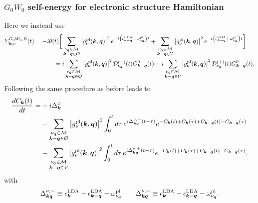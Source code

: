 \subsubsection{$G_0W_0$ self-energy for electronic structure Hamiltonian}
Here we instead use 
\begin{align}
\Sigma_{\bm{k},c}^{G_0W_0,R}(t)
=
-i\theta(t)
\bigg[
&
\sum_{\substack{\nu_{\bm q}\in\mathcal M\\
\bm{k}-\bm q\in\mathcal O}}
\left|g_{\nu}^{\rm pl}(\bm{k},\bm q)\right|^2
e^{-i\left(
\epsilon_{\bm{k}-\bm q}^{\rm LDA}
-
\omega_{\nu_{\bm q}}^{\rm pl}
\right)t}+
\sum_{\substack{\nu_{\bm q}\in\mathcal M\\
\bm{k}-\bm q\in\mathcal V}}
\left|g_{\nu}^{\rm pl}(\bm{k},\bm q)\right|^2
e^{-i\left(
\epsilon_{\bm{k}-\bm q}^{\rm LDA}
+
\omega_{\nu_{\bm q}}^{\rm pl}
\right)t}
\bigg]\\
={}&
i
\sum_{\substack{\nu_{\bm q}\in\mathcal M\\
\bm{k}-\bm q\in\mathcal O}}
\left|g_{\nu}^{\rm pl}(\bm{k},\bm q)\right|^2
\mathcal D_{\nu_{\bm q}}^{(-)}(t)
G_{\bm{k}-\bm q}^{0}(t)+
i
\sum_{\substack{\nu_{\bm q}\in\mathcal M\\
\bm{k}-\bm q\in\mathcal V}}
\left|g_{\nu}^{\rm pl}(\bm{k},\bm q)\right|^2
\mathcal D_{\nu_{\bm q}}^{(+)}(t)
G_{\bm{k}-\bm q}^{0}(t).
\end{align}
Following the same procedure as before leads to 
\begin{align}
\frac{dC_{\bm{k}}(t)}{dt}
=&
-i\Delta_{\bm{k}}^x
\nonumber\\
&-
\sum_{\substack{\nu_{\bm q}\in\mathcal M\\
\bm{k}-\bm q\in\mathcal O}}
\left|g_{\nu}^{\rm pl}(\bm{k},\bm q)\right|^2
\int_0^t d\tau\,
e^{i\Delta_{\bm{k}\bm q}^{\nu,-}(t-\tau)}
e^{
-C_{\bm{k}}(t)
+C_{\bm{k}}(\tau)
+C_{\bm{k}-\bm q}(t)
-C_{\bm{k}-\bm q}(\tau)
}
\nonumber\\
&-
\sum_{\substack{\nu_{\bm q}\in\mathcal M\\
\bm{k}-\bm q\in\mathcal V}}
\left|g_{\nu}^{\rm pl}(\bm{k},\bm q)\right|^2
\int_0^t d\tau\,
e^{i\Delta_{\bm{k}\bm q}^{\nu,+}(t-\tau)}
e^{
-C_{\bm{k}}(t)
+C_{\bm{k}}(\tau)
+C_{\bm{k}-\bm q}(t)
-C_{\bm{k}-\bm q}(\tau)
}.
\end{align}
with 
\begin{equation}
\Delta_{\bm{k}\bm q}^{\nu,-}
\equiv
\epsilon_{\bm{k}}^{\rm LDA}
-\epsilon_{\bm{k}-\bm q}^{\rm LDA}
+\omega_{\nu_{\bm q}}^{\rm pl}
\qquad
\Delta_{\bm{k}\bm q}^{\nu,+}
\equiv
\epsilon_{\bm{k}}^{\rm LDA}
-\epsilon_{\bm{k}-\bm q}^{\rm LDA}
-\omega_{\nu_{\bm q}}^{\rm pl}.
\end{equation}

